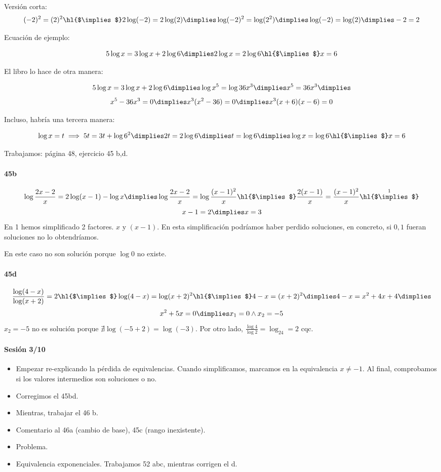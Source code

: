 \documentclass[palatino,nosec]{Docencia}
\newcommand{\cimplies}{\text{\hl{$\implies$}}}
\begin{document}
Versión corta:
\[
	(-2)^2 = (2)^2 \text{\hl{$\implies$}} 2\log(-2) = 2\log(2) \dimplies \log(-2)^2 = \log(2^2) \dimplies \log(-2) = \log(2) \dimplies -2=2
\]

Ecuación de ejemplo:

\[
	5\log x=3\log x+2\log 6 \dimplies 2\log x=2\log6 \text{\hl{$\implies$}} x=6
\]


El libro lo hace de otra manera:

\[
	5\log x=3\log x+2\log 6 \dimplies \log x^5=\log36x^3 \dimplies x^5=36x^3 \dimplies
\]
\[
	x^5-36x^3 = 0 \dimplies x^3(x^2-36) = 0 \dimplies x^3(x+6)(x-6) = 0
\]

Incluso, habría una tercera manera:

\[
	\log x=t \implies 5t=3t+\log6^2 \dimplies 2t=2\log6 \dimplies t=\log6 \dimplies \log x=\log6 \text{\hl{$\implies$}} x=6
\]

Trabajamos: página 48, ejercicio 45 b,d.

\paragraph{45b}
\[
	\log\frac{2x-2}{x} = 2\log(x-1)-\log x \dimplies \log \frac{2x-2}{x}=\log\frac{(x-1)^2}{x} \cimplies \frac{2(x-1)}{x} = \frac{(x-1)^2}{x} \overset{1}{\cimplies}
	\]
	\[ 
	x-1=2 \dimplies x=3
\]
En 1 hemos simplificado 2 factores. $x$ y $(x-1)$. En esta simplificación podríamos haber perdido soluciones, en concreto, si $0,1$ fueran soluciones no lo obtendríamos. 

En este caso no son solución porque $\log 0$ no existe.

\paragraph{45d}
\[
\frac{\log (4-x)}{\log(x+2)}=2 \cimplies \log(4-x) = \log(x+2)^2 \cimplies 4-x=(x+2)^2 \dimplies 4-x=x^2+4x+4 \dimplies
	\]
	\[ x^2+5x=0 \dimplies x_1=0 \wedge x_2=-5
\]
$x_2=-5$ no es solución porque $\nexists\log(-5+2)=\log(-3)$. Por otro lado, $\frac{\log4}{\log2} = \log_24=2$ cqc.

\paragraph{Sesión 3/10}
\begin{itemize}
	\item Empezar re-explicando la pérdida de equivalencias. Cuando simplificamos, marcamos en la equivalencia $x\neq-1$. Al final, comprobamos si los valores intermedios son soluciones o no.
	\item Corregimos el 45bd.
	\item Mientras, trabajar el 46 b.
	\item Comentario al 46a (cambio de base), 45c (rango inexistente).
	\item Problema.
	\item Equivalencia exponenciales. Trabajamos 52 abc, mientras corrigen el d.
\end{itemize}
\end{document}
